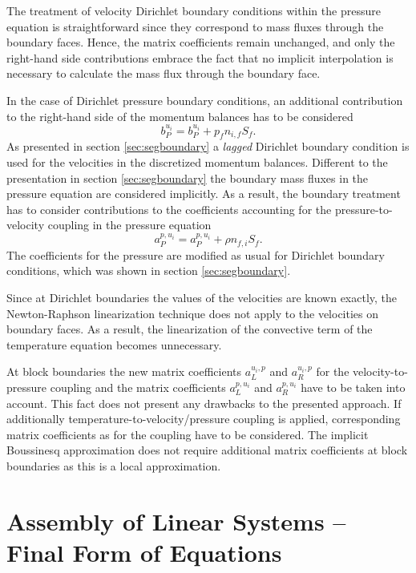 The treatment of velocity Dirichlet boundary conditions within the pressure equation is straightforward since they correspond to mass fluxes through the boundary faces. Hence, the matrix coefficients remain unchanged, and only the right-hand side contributions embrace the fact that no implicit interpolation is necessary to calculate the mass flux through the boundary face.

In the case of Dirichlet pressure boundary conditions, an additional contribution to the right-hand side of the momentum balances has to be considered
\begin{displaymath}
  b_P^{u_i} = b_P^{u_i} + p_f n_{i,f} S_f.
\end{displaymath}
As presented in section \ref{sec:segboundary} a \emph{lagged} Dirichlet boundary condition is used for the velocities in the discretized momentum balances. Different to the presentation in section \ref{sec:segboundary} the boundary mass fluxes in the pressure equation are considered implicitly. As a result, the boundary treatment has to consider contributions to the coefficients accounting for the pressure-to-velocity coupling in the pressure equation
\begin{displaymath}
  a_P^{p,u_i} = a_P^{p,u_i} + \rho n_{f,i} S_f.
\end{displaymath}
The coefficients for the pressure are modified as usual for Dirichlet boundary conditions, which was shown in section \ref{sec:segboundary}.

Since at Dirichlet boundaries the values of the velocities are known exactly, the Newton-Raphson linearization technique does not apply to the velocities on boundary faces. As a result, the linearization of the convective term of the temperature equation becomes unnecessary.

At block boundaries the new matrix coefficients \(a_L^{u_i,p}\) and \(a_R^{u_i,p}\) for the velocity-to-pressure coupling and the matrix coefficients \(a_L^{p,u_i}\) and \(a_R^{p,u_i}\) have to be taken into account. This fact does not present any drawbacks to the presented approach. If additionally temperature-to-velocity/pressure coupling is applied, corresponding matrix coefficients as for the coupling have to be considered. The implicit Boussinesq approximation does not require additional matrix coefficients at block boundaries as this is a local approximation.

\section{Assembly of Linear Systems -- Final Form of Equations}
\label{sec:cpldassembly}

